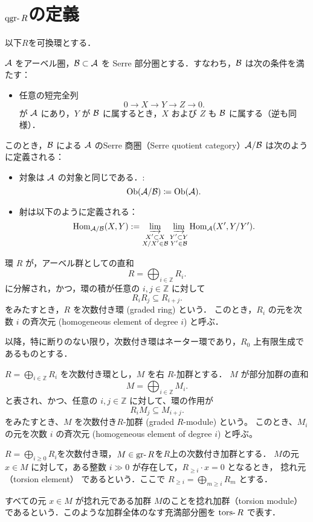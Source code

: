 \section{$\qgr R$の定義}

以下$R$を可換環とする．
\begin{defn}
${\mathcal A}$ をアーベル圏，${\mathcal B} \subset {\mathcal A}$ を Serre 部分圏とする．すなわち，${\mathcal B}$ は次の条件を満たす：
\begin{itemize}
  \item 任意の短完全列
  \[
  0 \to X \to Y \to Z \to 0.
  \]
  が ${\mathcal A}$ にあり，$Y$ が ${\mathcal B}$ に属するとき，$X$ および $Z$ も ${\mathcal B}$ に属する（逆も同様）．
\end{itemize}
このとき，${\mathcal B}$ による ${\mathcal A}$ のSerre 商圏（Serre quotient category）${\mathcal A}/{\mathcal B}$ は次のように定義される：
\begin{itemize}
  \item 対象は ${\mathcal A}$ の対象と同じである．:
		\[\mathrm{Ob}({\mathcal A}/{\mathcal B})\coloneq \mathrm{Ob}({\mathcal A}).\]
  \item 射は以下のように定義される：
  \[
  \operatorname{\mathrm{Hom}}_{{\mathcal A}/{\mathcal B}}(X, Y) := \varinjlim_{\substack{X' \subset X\\ X/X' \in {\mathcal B}}} \varinjlim_{\substack{Y' \subset Y\\ Y' \in {\mathcal B}}} \operatorname{\mathrm{Hom}}_{{\mathcal A}}(X', Y/Y').
  \]
\end{itemize}
\end{defn}

\begin{defn}[次数付き環]
環 $R$ が，アーベル群としての直和
\[ R = \bigoplus_{i \in \mathbb{Z}} R_i. \]
に分解され，かつ，環の積が任意の $i, j \in \mathbb{Z}$ に対して
\[ R_i R_j \subseteq R_{i+j} .\]
をみたすとき，$R$ を次数付き環 (graded ring) という．
このとき，$R_i$ の元を次数 $i$ の斉次元 (homogeneous element of degree $i$) と呼ぶ．
\end{defn}
以降，特に断りのない限り，次数付き環はネーター環であり，$R_0$ 上有限生成であるものとする．

\begin{defn}[次数付き加群]
$R = \bigoplus_{i \in \mathbb{Z}} R_i$ を次数付き環とし，$M$ を右 $R$-加群とする．
$M$ が部分加群の直和
\[ M = \bigoplus_{i \in \mathbb{Z}} M_i. \]
と表され、かつ、任意の $i, j \in \mathbb{Z}$ に対して、環の作用が
\[ R_i M_j \subseteq M_{i+j} .\]
をみたすとき、$M$ を次数付き$R$-加群 (graded $R$-module) という。
このとき、$M_i$ の元を次数 $i$ の斉次元 (homogeneous element of degree $i$) と呼ぶ。
\end{defn}
	
\begin{defn}
	 \( R = \bigoplus_{i \ge 0} R_i \)を次数付き環，\( M \in \gr R \)を$R$上の次数付き加群とする． $M$の元\( x \in M \) に対して，ある整数 \( i \gg 0 \) が存在して，\( R_{\ge i} \cdot x = 0 \) となるとき， 捻れ元（torsion element） であるという．ここで \( R_{\ge i} = \bigoplus_{m \ge i} R_m \) とする．

すべての元 \( x \in M \) が捻れ元である加群 \( M \)のことを捻れ加群（torsion module） であるという．このような加群全体のなす充満部分圏を \(\tors R\) で表す．
\end{defn}

